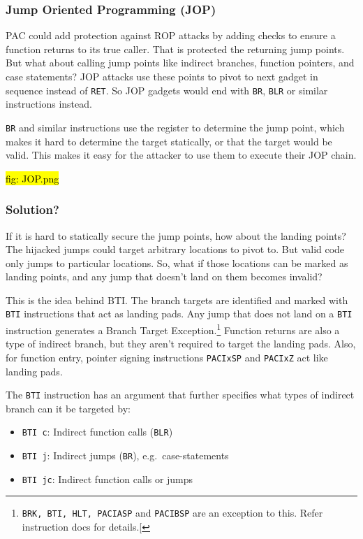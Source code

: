 \documentclass[a4paper, nobind]{templates/ociamthesis}
\providecommand{\tightlist}{%
  \setlength{\itemsep}{0pt}\setlength{\parskip}{0pt}}
\begin{document}
\subsubsection{Jump Oriented Programming (JOP)}\label{jump-oriented-programming-jop}

PAC could add protection against ROP attacks by adding checks to ensure a
function returns to its true caller. That is protected the returning jump points.
But what about calling jump points like indirect branches, function pointers,
and case statements? JOP attacks use these points to pivot to next gadget in
sequence instead of \texttt{RET}. So JOP gadgets would end with \texttt{BR}, \texttt{BLR} or similar instructions instead.

\texttt{BR} and similar instructions use the register to determine the jump point, which
makes it hard to determine the target statically, or that the target would be valid.
This makes it easy for the attacker to use them to execute their JOP chain.

\hl{fig: JOP.png}

\subsubsection{Solution?}\label{solution-1}

If it is hard to statically secure the jump points, how about the landing points?
The hijacked jumps could target arbitrary locations to pivot to.
But valid code only jumps to particular locations. So, what if those locations
can be marked as landing points, and any jump that doesn't land on them becomes invalid?

This is the idea behind BTI. The branch targets are identified and marked with \texttt{BTI}
instructions that act as landing pads. Any jump that does not land on a \texttt{BTI} instruction
generates a Branch Target Exception.\footnote{\texttt{BRK,\ BTI,\ HLT,\ PACIASP} and \texttt{PACIBSP} are an exception to this.
  Refer instruction docs for details.{[}\citeproc{ref-armasm-user-guide}{4}{]}}
Function returns are also a type of indirect branch, but they aren't required
to target the landing pads. Also, for function entry,
pointer signing instructions \texttt{PACIxSP} and \texttt{PACIxZ} act like landing pads.

The \texttt{BTI} instruction has an argument that further specifies what types of indirect branch can it be targeted by:

\begin{itemize}
\tightlist
\item
  \texttt{BTI\ c}: Indirect function calls (\texttt{BLR})
\item
  \texttt{BTI\ j}: Indirect jumps (\texttt{BR}), e.g.~case-statements
\item
  \texttt{BTI\ jc}: Indirect function calls or jumps
\end{itemize}
\end{document}
